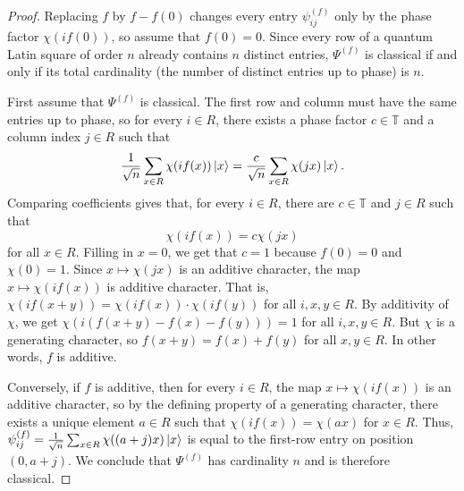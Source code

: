 \documentclass[10pt,a4paper]{amsart}
\begin{document}
\begin{proof}
    Replacing \(f\) by \(f-f(0)\) changes every entry \(\psi_{ij}^{(f)}\) only by the phase factor \(\chi(if(0))\), so assume that \(f(0)=0\).
    Since every row of a quantum Latin square of order \(n\) already contains \(n\) distinct entries, \(\Psi^{(f)}\) is classical if and only if its total cardinality (the number of distinct entries up to phase) is \(n\).

    First assume that \(\Psi^{(f)}\) is classical. The first row and column must have the same entries up to phase, so for every \(i\in R\), there exists a phase factor \(c\in\mathbb{T}\) and a column index \(j\in R\) such that
    \[\frac1{\sqrt{n}}\sum_{x\in R}\chi(if(x))\ket{x}=\frac{c}{\sqrt{n}}\sum_{x\in R}\chi(jx)\ket{x}.\]
    Comparing coefficients gives that, for every \(i\in R\), there are \(c\in\mathbb{T}\) and \(j\in R\) such that
    \[\chi(if(x))=c\chi(jx)\]
    for all \(x\in R\).
    Filling in \(x=0\), we get that \(c=1\) because \(f(0)=0\) and \(\chi(0)=1\). 
    Since \(x\mapsto \chi(jx)\) is an additive character, the map \(x\mapsto\chi(if(x))\) is additive character. That is, \(\chi(if(x+y))=\chi(if(x))\cdot\chi(if(y))\) for all \(i,x,y\in R\). By additivity of \(\chi\), we get \(\chi(i(f(x+y)-f(x)-f(y)))=1\) for all \(i,x,y\in R\). But \(\chi\) is a generating character, so \(f(x+y)=f(x)+f(y)\) for all \(x,y\in R\). In other words, \(f\) is additive.
    
    Conversely, if \(f\) is additive, then for every \(i\in R\), the map \(x\mapsto\chi(if(x))\) is an additive character, so by the defining property of a generating character, there exists a unique element \(a\in R\) such that \(\chi(if(x))=\chi(ax)\) for \(x\in R\). Thus, \(\psi_{ij}^{(f)}=\frac1{\sqrt{n}}\sum_{x\in R}\chi((a+j)x)\ket{x}\) is equal to the first-row entry on position \((0,a+j)\). We conclude that \(\Psi^{(f)}\) has cardinality \(n\) and is therefore classical.
\end{proof}
\end{document}
